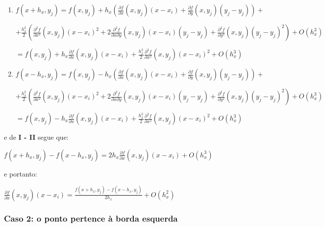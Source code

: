 \documentclass[11pt]{article}
\begin{document}
  \begin{enumerate}[label=\textbf{\Roman*)}]
    \item $f(x + h_x, y_j) = f(x, y_j) + h_x\left(\frac{\partial f}{\partial x}\left(x, y_j \right)\left(x - x_i \right) + \frac{\partial f}{\partial y}\left(x, y_j \right)\left(y_j - y_j \right) \right) +$

    $+ \frac{h_x^2}{2}\left(\frac{\partial^2 f}{\partial x^2}\left(x, y_j\right)\left(x - x_i\right)^2 + 2\frac{\partial^2 f}{\partial x \partial y}\left(x, y_j \right)\left(x - x_i\right)\left(y_j - y_j\right) +
    \frac{\partial^2 f}{\partial y^2}\left(x, y_j\right)\left(y_j - y_j\right)^2 \right) + O(h_x^3)$

    $= f(x, y_j) + h_x\frac{\partial f}{\partial x}\left(x, y_j \right)\left(x - x_i \right) + \frac{h_x^2}{2}\frac{\partial^2 f}{\partial x^2}\left(x, y_j\right)\left(x - x_i\right)^2 + O(h_x^3)$


    \item $f(x - h_x, y_j) = f(x, y_j) - h_x\left(\frac{\partial f}{\partial x}\left(x, y_j \right)\left(x - x_i \right) + \frac{\partial f}{\partial y}\left(x, y_j \right)\left(y_j - y_j \right) \right) +$

    $+ \frac{h_x^2}{2}\left(\frac{\partial^2 f}{\partial x^2}\left(x, y_j\right)\left(x - x_i\right)^2 + 2\frac{\partial^2 f}{\partial x \partial y}\left(x, y_j \right)\left(x - x_i\right)\left(y_j - y_j\right) +
    \frac{\partial^2 f}{\partial y^2}\left(x, y_j\right)\left(y_j - y_j\right)^2 \right) + O(h_x^3)$

    $= f(x, y_j) - h_x\frac{\partial f}{\partial x}\left(x, y_j \right)\left(x - x_i \right) + \frac{h_x^2}{2}\frac{\partial^2 f}{\partial x^2}\left(x, y_j\right)\left(x - x_i\right)^2 + O(h_x^3)$
  \end{enumerate}

  e de \textbf{I - II} segue que:

  $f(x + h_x, y_j) - f(x - h_x, y_j) = 2h_x\frac{\partial f}{\partial x}\left(x, y_j \right)\left(x - x_i \right) + O(h_x^3)$

  e portanto:

  $\frac{\partial f}{\partial x}\left(x, y_j \right)\left(x - x_i \right) = \frac{f(x + h_x, y_j) - f(x - h_x, y_j)}{2h_x}  + O(h_x^2)$

  \subsubsection{Caso 2: o ponto pertence à borda esquerda}
\end{document}
